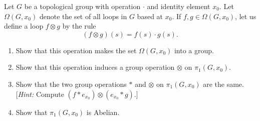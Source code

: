 \begin{problem}
Let $G$ be a topological group with operation $\cdot$ and identity element
$x_0$. Let $\Omega(G,x_0)$ denote the set of all loops in $G$ based at
$x_0$. If $f,g\in\Omega(G,x_0)$, let us define a loop $f\otimes g$ by the
rule
\[
(f\otimes g)(s)=f(s)\cdot g(s).
\]
\begin{enumerate}[label=(\alph*)]
\item Show that this operation makes the set $\Omega(G,x_0)$ into a group.
\item Show that this operation induces a group operation $\otimes$ on
  $\pi_1(G,x_0)$.
\item Show that the two group operations $*$ and $\otimes$ on
  $\pi_1(G,x_0)$ are the same. [\emph{Hint:} Compute
  $(f*e_{x_0})\otimes(e_{x_0}*g)$.]
\item Show that $\pi_1(G,x_0)$ is Abelian.
\end{enumerate}
\end{problem}
